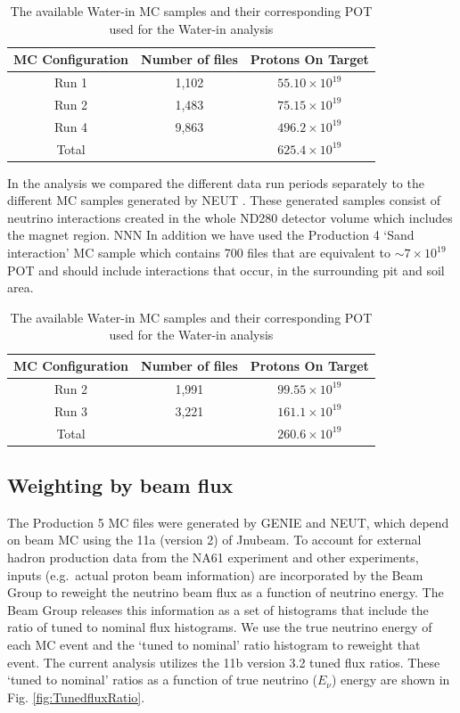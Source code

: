 \begin{table}[h]
\centering
\begin{tabular}{ccc} \toprule
MC Configuration & Number of files & Protons On Target \\
\hline
Run 1 & 1,102 & $55.10 \times 10^{19}$ \\ 
Run 2 & 1,483 & $75.15 \times 10^{19}$ \\ 
Run 4 & 9,863 & $496.2 \times 10^{19}$ \\ 
\hline
Total &  &$625.4 \times 10^{19}$ \\ 
\bottomrule
\end{tabular} 
\caption{The available Water-in MC samples and their corresponding 
POT used for the Water-in analysis}
\label{tab:MCSamplesRun1Run2Run4} %
\end{table}

In the analysis we compared the different data run periods   
separately to the different MC samples generated by NEUT \cite{neut}. 
These generated samples consist of neutrino interactions created 
in the whole ND280 detector volume which includes the magnet region.
NNN 
In addition we have used the Production 4 `Sand interaction' MC sample 
which contains 700 files that are equivalent to $\sim7\times 10^{19}$ POT 
and should include interactions that occur, 
in the surrounding pit and soil area.

\begin{table}[h]
\centering
\begin{tabular}{ccc} \toprule
MC Configuration & Number of files & Protons On Target \\
\hline
Run 2 & 1,991 & $99.55 \times 10^{19}$ \\ 
Run 3 & 3,221 & $161.1 \times 10^{19}$ \\ 
\hline
Total &  &$260.6 \times 10^{19}$ \\ 
\bottomrule
\end{tabular} 
\caption{The available Water-in MC samples and their corresponding 
POT used for the Water-in analysis}
\label{tab:MCSamplesRun1Run2Run4} %
\end{table}

 
\subsection{Weighting by beam flux} 

The Production 5 MC files were generated by GENIE and NEUT, 
which depend on beam MC using the 11a (version 2) of Jnubeam. 
To account for external hadron production data 
from the NA61 experiment and other experiments, 
inputs (e.g.~actual proton beam information) 
are incorporated by the Beam Group
to reweight the neutrino beam flux as a function of neutrino energy. 
The Beam Group releases
this information as a set of histograms that include 
the ratio of tuned to nominal flux histograms. 
We use the true neutrino energy of each MC event and the `tuned to nominal' 
ratio histogram to reweight that event.
The current analysis utilizes the 11b version 3.2 tuned flux ratios.
These `tuned to nominal' ratios as a
function of true neutrino ($E_{\nu}$) energy are shown 
in Fig. \ref{fig:TunedfluxRatio}.


